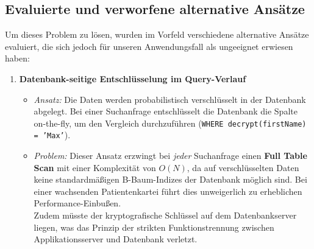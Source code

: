 \subsection{Evaluierte und verworfene alternative Ansätze}

Um dieses Problem zu lösen, wurden im Vorfeld verschiedene alternative Ansätze evaluiert, die sich jedoch für unseren Anwendungsfall als ungeeignet erwiesen haben:
\begin{enumerate}
    \item \textbf{Datenbank-seitige Entschlüsselung im Query-Verlauf}
    \begin{itemize}
        \item \textit{Ansatz:} Die Daten werden probabilistisch verschlüsselt in der Datenbank abgelegt. Bei einer Suchanfrage entschlüsselt die Datenbank die Spalte on-the-fly, um den Vergleich durchzuführen (\texttt{WHERE decrypt(firstName) = 'Max'}).
        \item \textit{Problem:} Dieser Ansatz erzwingt bei \textit{jeder} Suchanfrage einen \textbf{Full Table Scan} mit einer Komplexität von $O(N)$, da auf verschlüsselten Daten keine standardmäßigen B-Baum-Indizes der Datenbank möglich sind. 
        Bei einer wachsenden Patientenkartei führt dies unweigerlich zu erheblichen Performance-Einbußen.
        \\Zudem müsste der kryptografische Schlüssel auf dem Datenbankserver liegen, was das Prinzip der strikten Funktionstrennung zwischen Applikationsserver und Datenbank verletzt.
    \end{itemize}



\end{enumerate}
